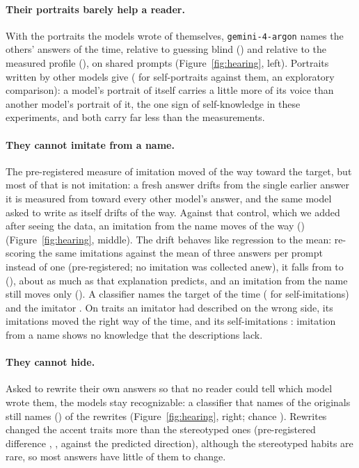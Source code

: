 \documentclass[11pt]{article}
\begin{document}
\paragraph{Their portraits barely help a reader.}
With the portraits the models wrote of themselves, \texttt{gemini-4-argon} names the others' answers \portraitSelf{} of the time, \portraitVsBlind{} relative to guessing blind (\portraitBlind) and \portraitVsMeasured{} relative to the measured profile (\portraitMeasured), on \portraitPrompts{} shared prompts (Figure~\ref{fig:hearing}, left).
Portraits written by other models give \portraitPeer{} (\portraitVsPeer{} for self-portraits against them, an exploratory comparison): a model's portrait of itself carries a little more of its voice than another model's portrait of it, the one sign of self-knowledge in these experiments, and both carry far less than the measurements.

\paragraph{They cannot imitate from a name.}
The pre-registered measure of imitation moved \imRegistered{} of the way toward the target, but most of that is not imitation: a fresh answer drifts from the single earlier answer it is measured from toward every other model's answer, and the same model asked to write as itself drifts \imDrift{} of the way.
Against that control, which we added after seeing the data, an imitation from the name moves \imName{} of the way (\imNameCI) (Figure~\ref{fig:hearing}, middle).
The drift behaves like regression to the mean: re-scoring the same imitations against the mean of three answers per prompt instead of one (pre-registered; no imitation was collected anew), it falls from \imDrift{} to \repDriftAvg{} (\repDriftAvgCI), about as much as that explanation predicts, and an imitation from the name still moves only \repNameAvg{} (\repNameAvgCI).
A classifier names the target \imNamedTarget{} of the time (\imNamedBase{} for self-imitations) and the imitator \imNamedImitator.
On traits an imitator had described on the wrong side, its imitations moved the right way \imIThree{} of the time, and its self-imitations \imIThreeSelf{}: imitation from a name shows no knowledge that the descriptions lack.

\paragraph{They cannot hide.}
Asked to rewrite their own answers so that no reader could tell which model wrote them, the models stay recognizable: a classifier that names \hideOriginal{} of the originals still names \hideUncoached{} (\hideUncoachedCI) of the rewrites (Figure~\ref{fig:hearing}, right; chance \chance).
Rewrites changed the accent traits more than the stereotyped ones (pre-registered difference \hideHTwo{}, \hideHTwoCI{}, against the predicted direction), although the stereotyped habits are rare, so most answers have little of them to change.
\end{document}
